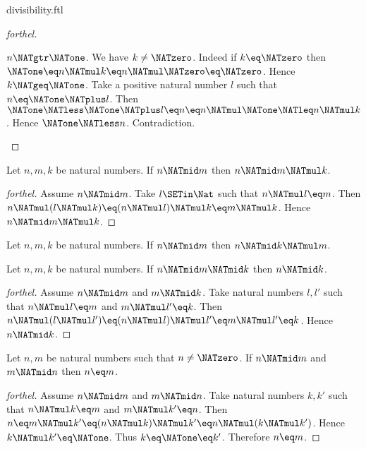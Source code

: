 \documentclass{naproche-library}
\begin{document}
\begin{smodule}[title=Divisibility]{divisibility.ftl}
\begin{proof}[forthel]
  \begin{case}{$n \NATgtr \NATone$.}
    We have $k \neq \NATzero$.
    Indeed if $k \eq \NATzero$ then
    $\NATone
      \eq n \NATmul k
      \eq n \NATmul \NATzero
      \eq \NATzero$.
    Hence $k \NATgeq \NATone$.
    Take a positive natural number $l$ such that $n \eq \NATone \NATplus l$.
    Then $\NATone
      \NATless \NATone \NATplus l
      \eq n
      \eq n \NATmul \NATone
      \NATleq n \NATmul k$.
    Hence $\NATone \NATless n$.
    Contradiction.
  \end{case}
\end{proof}

\begin{proposition}[forthel,id=ARITHMETIC_07_7463519983239168]
  Let $n, m, k$ be natural numbers.
  If $n \NATmid m$ then $n \NATmid m \NATmul k$.
\end{proposition}
\begin{proof}[forthel]
  Assume $n \NATmid m$.
  Take $l \SETin \Nat$ such that $n \NATmul l \eq m$.
  Then $n \NATmul (l \NATmul k)
    \eq (n \NATmul l) \NATmul k
    \eq m \NATmul k$.
  Hence $n \NATmid m \NATmul k$.
\end{proof}

\begin{corollary}[forthel,id=ARITHMETIC_07_1588185794609152]
  Let $n, m, k$ be natural numbers.
  If $n \NATmid m$ then $n \NATmid k \NATmul m$.
\end{corollary}

\begin{proposition}[forthel,id=ARITHMETIC_07_7863858316181504]
  Let $n, m, k$ be natural numbers.
  If $n \NATmid m \NATmid k$ then $n \NATmid k$.
\end{proposition}
\begin{proof}[forthel]
  Assume $n \NATmid m$ and $m \NATmid k$.
  Take natural numbers $l,l'$ such that $n \NATmul l \eq m$ and $m \NATmul l' \eq k$.
  Then $n \NATmul (l \NATmul l')
    \eq (n \NATmul l) \NATmul l'
    \eq m \NATmul l'
    \eq k$.
  Hence $n \NATmid k$.
\end{proof}

\begin{proposition}[forthel,id=ARITHMETIC_07_4933275640397824]
  Let $n, m$ be natural numbers such that $n \neq \NATzero$.
  If $n \NATmid m$ and $m \NATmid n$ then $n \eq m$.
\end{proposition}
\begin{proof}[forthel]
  Assume $n \NATmid m$ and $m \NATmid n$.
  Take natural numbers $k,k'$ such that $n \NATmul k \eq m$ and $m \NATmul k' \eq n$.
  Then $n
    \eq m \NATmul k'
    \eq (n \NATmul k) \NATmul k'
    \eq n \NATmul (k \NATmul k')$.
  Hence $k \NATmul k' \eq \NATone$.
  Thus $k \eq \NATone \eq k'$.
  Therefore $n \eq m$.
\end{proof}


\end{smodule}
\end{document}
